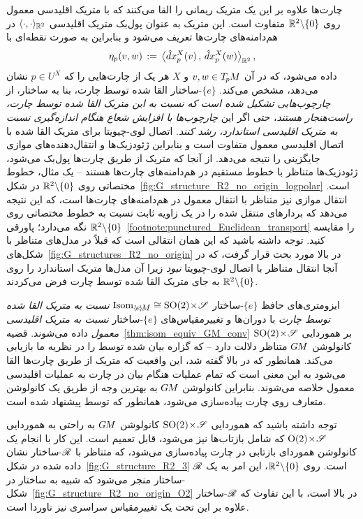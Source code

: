 چارت‌ها علاوه بر این یک متریک ریمانی را القا می‌کنند که با متریک اقلیدسی معمول روی $\mathbb{R}^2 \backslash \{0\}$ متفاوت است.
این متریک به عنوان پول‌بک متریک اقلیدسی $\langle \cdot,\cdot \rangle_{\mathbb{R}^2}$ در هم‌دامنه‌های چارت‌ها تعریف می‌شود و بنابراین به صورت نقطه‌ای با
\begin{align}
	\eta_p(v,w) \,:=\, \big\langle \hat{d}x^X_p(v) \,,\, \hat{d}x^X_p(w) \big\rangle_{\mathbb{R}^2} \,,
\end{align}
داده می‌شود، که در آن $v,w \in T_{\mkern-1.5mu p}\mkern-.5muM$ و $X$ هر یک از چارت‌هایی را که $p\in U^X$ نشان می‌دهد، مشخص می‌کند.
$\{e\}$-ساختار القا شده توسط چارت، بنا به ساختار، از \emph{چارچوب‌هایی تشکیل شده است که نسبت به این متریک القا شده توسط چارت، راست‌هنجار هستند}، حتی اگر این \emph{چارچوب‌ها با افزایش شعاع هنگام اندازه‌گیری نسبت به متریک اقلیدسی استاندارد، رشد کنند}.
اتصال لوی-چیویتا برای متریک القا شده با اتصال اقلیدسی معمول متفاوت است و بنابراین ژئودزیک‌ها و انتقال‌دهنده‌های موازی جایگزینی را نتیجه می‌دهد.
از آنجا که متریک از طریق چارت‌ها پول‌بک می‌شود، ژئودزیک‌ها متناظر با خطوط مستقیم در هم‌دامنه‌های چارت‌ها هستند -- یک مثال، خطوط مختصاتی روی $\mathbb{R}^2 \backslash \{0\}$ در شکل~\ref{fig:G_structure_R2_no_origin_logpolar} است.
انتقال موازی نیز متناظر با انتقال معمول در هم‌دامنه‌های چارت‌ها است، که این نتیجه می‌دهد که بردارهای منتقل شده را در یک زاویه ثابت نسبت به خطوط مختصاتی روی $\mathbb{R}^2 \backslash \{0\}$ نگه می‌دارد؛ پاورقی~\ref{footnote:punctured_Euclidean_transport} را مقایسه کنید.
توجه داشته باشید که این همان انتقالی است که قبلاً در مدل‌های متناظر با شکل‌های~\ref{fig:G_structures_R2_no_origin} در بالا مورد بحث قرار گرفت، که در آنجا انتقال متناظر با اتصال لوی-چیویتا \emph{نبود} زیرا آن مدل‌ها متریک استاندارد را روی $\mathbb{R}^2 \backslash \{0\}$ به جای متریک القا شده توسط چارت فرض می‌کردند.

ایزومتری‌های حافظ $\{e\}$-ساختار $\IsomeM \cong {\SO2 \!\times\! \Scale}$ \emph{نسبت به متریک القا شده توسط چارت} با دوران‌ها و تغییرمقیاس‌های $\{e\}$-ساختار \emph{نسبت به متریک اقلیدسی معمول} داده می‌شوند.
قضیه~\ref{thm:isom_equiv_GM_conv} بر هموردایی ${\operatorname{SO}(2) \!\times\! \mathscr{S}}$ کانولوشن $G\mkern-1.4muM$ متناظر دلالت دارد -- که گزاره بیان شده توسط \citet{esteves2017polar} را در نظریه ما بازیابی می‌کند.
همانطور که در بالا گفته شد، این واقعیت که متریک از طریق چارت‌ها القا می‌شود به این معنی است که تمام عملیات هنگام بیان در چارت به عملیات اقلیدسی معمول خلاصه می‌شوند.
بنابراین کانولوشن $G\mkern-1.4muM$ به بهترین وجه از طریق یک کانولوشن متعارف روی چارت پیاده‌سازی می‌شود، همانطور که توسط \citet{esteves2017polar} پیشنهاد شده است.

توجه داشته باشید که هموردایی ${\operatorname{SO}(2) \!\times\! \mathscr{S}}$ کانولوشن $G\mkern-1.4muM$ به راحتی به هموردایی ${\operatorname{O}(2) \!\times\! \mathscr{S}}$ که شامل بازتاب‌ها نیز می‌شود، قابل تعمیم است.
این کار با انجام یک کانولوشن هموردای بازتابی در چارت پیاده‌سازی می‌شود، که متناظر با $\mathscr{R}$-ساختار نشان داده شده در شکل~\ref{fig:G_structure_R2_3} است.
روی $\mathbb{R}^2 \backslash \{0\}$، این امر به یک $\mathscr{R}$-ساختار منجر می‌شود که شبیه به ساختار در شکل~\ref{fig:G_structure_R2_no_origin_O2} در بالا است، با این تفاوت که $\mathscr{R}$-ساختار علاوه بر این تحت یک تغییرمقیاس سراسری نیز ناوردا است.
